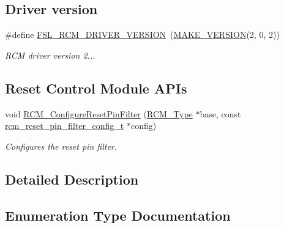 \subsection*{Driver version}
\begin{DoxyCompactItemize}
\item 
\mbox{\label{group__rcm_gaefb960efd7436af85a27c02bfd0b701b}} 
\#define \mbox{\hyperlink{group__rcm_gaefb960efd7436af85a27c02bfd0b701b}{F\+S\+L\+\_\+\+R\+C\+M\+\_\+\+D\+R\+I\+V\+E\+R\+\_\+\+V\+E\+R\+S\+I\+ON}}~(\mbox{\hyperlink{group__ftfx__utilities_ga812138aa3315b0c6953c1a26130bcc37}{M\+A\+K\+E\+\_\+\+V\+E\+R\+S\+I\+ON}}(2, 0, 2))
\begin{DoxyCompactList}\small\item\em R\+CM driver version 2... \end{DoxyCompactList}\end{DoxyCompactItemize}
\subsection*{Reset Control Module A\+P\+Is}
\begin{DoxyCompactItemize}
\item 
void \mbox{\hyperlink{group__rcm_ga71f36b52ea1c8e70c9e5d8d0cc306898}{R\+C\+M\+\_\+\+Configure\+Reset\+Pin\+Filter}} (\mbox{\hyperlink{struct_r_c_m___type}{R\+C\+M\+\_\+\+Type}} $\ast$base, const \mbox{\hyperlink{group__rcm_ga1ff478888c7dd7c6ed8ff27f8fb00f59}{rcm\+\_\+reset\+\_\+pin\+\_\+filter\+\_\+config\+\_\+t}} $\ast$config)
\begin{DoxyCompactList}\small\item\em Configures the reset pin filter. \end{DoxyCompactList}\end{DoxyCompactItemize}


\subsection{Detailed Description}


\subsection{Enumeration Type Documentation}
\mbox{\label{group__rcm_ga089aeb2329dd1c555a9a7493f3efff6a}} 

